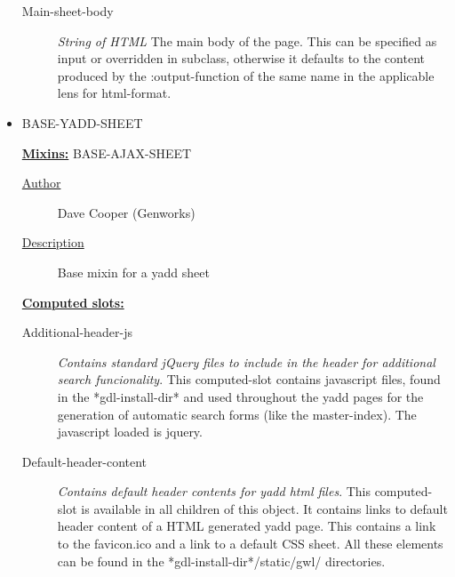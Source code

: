 \documentclass [11pt]{book}
\begin{document}
\begin{itemize}
\begin{description}
\item [Main-sheet-body]
\emph{String of HTML} The main body of the page.
This can be specified as input or overridden in subclass, otherwise it defaults
to the content produced by the :output-function of the same name
in the applicable lens for  html-format.


\end{description}







\item {}BASE-YADD-SHEET


\textbf{
\underline{Mixins:}} BASE-AJAX-SHEET





\begin{description}

\item [
\underline{Author}]


Dave Cooper (Genworks)



\item [
\underline{Description}]


Base mixin for a yadd sheet



\end{description}








\textbf{
\underline{Computed slots:}}

\begin{description}

\item [Additional-header-js]
\emph{Contains standard jQuery files to include in the header for additional search funcionality}.
This computed-slot contains javascript files, found in the *gdl-install-dir*
and used throughout the yadd pages for the generation of automatic search forms (like the master-index).
The javascript loaded is jquery.


\item [Default-header-content]
\emph{Contains default header contents for yadd html files}.
This computed-slot is available in all children of this object. It contains links
to default header content of a HTML generated yadd page. This contains a
link to the favicon.ico and a link to a default CSS sheet. All these elements can be
found in the *gdl-install-dir*/static/gwl/ directories.



\end{description}
\end{itemize}
\end{document}
